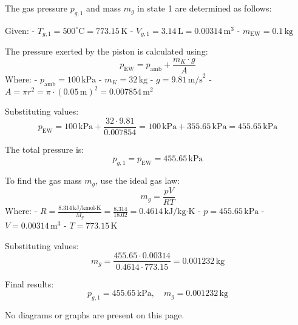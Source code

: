 The gas pressure \( p_{g,1} \) and mass \( m_g \) in state 1 are determined as follows:

Given:  
- \( T_{g,1} = 500^\circ\text{C} = 773.15 \, \text{K} \)  
- \( V_{g,1} = 3.14 \, \text{L} = 0.00314 \, \text{m}^3 \)  
- \( m_{\text{EW}} = 0.1 \, \text{kg} \)  

The pressure exerted by the piston is calculated using:  
\[
p_{\text{EW}} = p_{\text{amb}} + \frac{m_K \cdot g}{A}
\]  
Where:  
- \( p_{\text{amb}} = 100 \, \text{kPa} \)  
- \( m_K = 32 \, \text{kg} \)  
- \( g = 9.81 \, \text{m/s}^2 \)  
- \( A = \pi r^2 = \pi \cdot (0.05 \, \text{m})^2 = 0.007854 \, \text{m}^2 \)  

Substituting values:  
\[
p_{\text{EW}} = 100 \, \text{kPa} + \frac{32 \cdot 9.81}{0.007854} = 100 \, \text{kPa} + 355.65 \, \text{kPa} = 455.65 \, \text{kPa}
\]  

The total pressure is:  
\[
p_{g,1} = p_{\text{EW}} = 455.65 \, \text{kPa}
\]  

To find the gas mass \( m_g \), use the ideal gas law:  
\[
m_g = \frac{p V}{R T}
\]  
Where:  
- \( R = \frac{8.314 \, \text{kJ/kmol·K}}{M_g} = \frac{8.314}{18.02} = 0.4614 \, \text{kJ/kg·K} \)  
- \( p = 455.65 \, \text{kPa} \)  
- \( V = 0.00314 \, \text{m}^3 \)  
- \( T = 773.15 \, \text{K} \)  

Substituting values:  
\[
m_g = \frac{455.65 \cdot 0.00314}{0.4614 \cdot 773.15} = 0.001232 \, \text{kg}
\]  

Final results:  
\[
p_{g,1} = 455.65 \, \text{kPa}, \quad m_g = 0.001232 \, \text{kg}
\]  

No diagrams or graphs are present on this page.